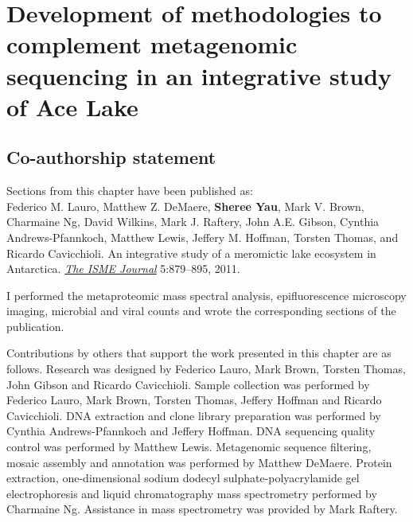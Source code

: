\chapter[Development of methodologies to complement metagenomic sequencing in an integrative study of Ace Lake]{Development of methodologies to complement metagenomic sequencing in an integrative study of  Ace Lake}
\label{ch:ace}
\acresetall

\section*{Co-authorship statement}

Sections from this chapter have been published as:\\

Federico M. Lauro, Matthew Z. DeMaere, \textbf{Sheree Yau}, Mark V. Brown, Charmaine Ng,
David Wilkins, Mark J. Raftery, John A.E. Gibson, Cynthia Andrews-Pfannkoch, Matthew Lewis,
Jeffery M. Hoffman, Torsten Thomas, and Ricardo Cavicchioli. 
An integrative study of a meromictic lake ecosystem in Antarctica. \emph{\underline{The ISME Journal}} 
5:879--895, 2011.

I performed the metaproteomic mass spectral analysis, epifluorescence microscopy imaging,
microbial and viral counts and wrote the corresponding sections of the publication.

Contributions by others that support the work presented in this chapter are as follows.
Research was designed by Federico Lauro, Mark Brown, Torsten Thomas, John Gibson and Ricardo Cavicchioli.
Sample collection was performed by Federico Lauro, Mark Brown, Torsten Thomas, Jeffery Hoffman and Ricardo Cavicchioli.
\textsc{DNA} extraction and clone library preparation was performed by Cynthia Andrews-Pfannkoch and Jeffery Hoffman.
\textsc{DNA} sequencing quality control was performed by Matthew Lewis.
Metagenomic sequence filtering, mosaic assembly and annotation was performed by Matthew DeMaere.
Protein extraction, one-dimensional sodium dodecyl sulphate-polyacrylamide gel electrophoresis and liquid chromatography mass spectrometry performed by Charmaine Ng.
Assistance in mass spectrometry was provided by Mark Raftery.
\newpage

